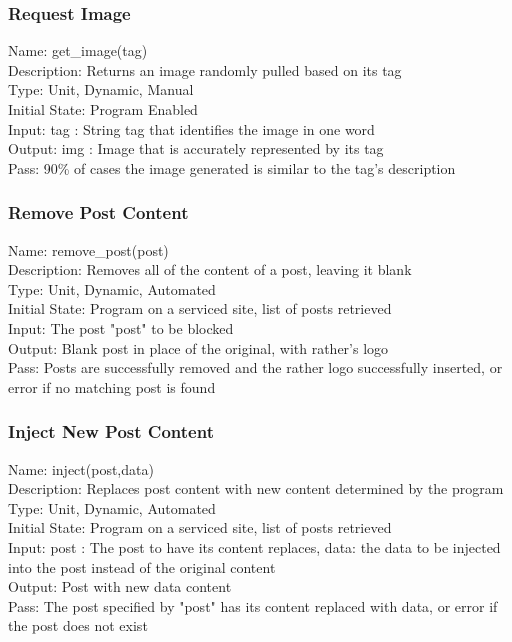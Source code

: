 \documentclass[12pt, titlepage]{article}
\begin{document}
\begin{enumerate}
\subsubsection{Request Image}
Name: get\_image(tag) \\
Description: Returns an image randomly pulled based on its tag \\
Type: Unit, Dynamic, Manual \\
Initial State: Program Enabled \\
Input: tag : String tag that identifies the image in one word \\
Output: img : Image that is accurately represented by its tag \\
Pass: 90\% of cases the image generated is similar to the tag's description \\
\subsubsection{Remove Post Content}
Name: remove\_post(post) \\
Description: Removes all of the content of a post, leaving it blank \\
Type: Unit, Dynamic, Automated \\
Initial State: Program on a serviced site, list of posts retrieved \\
Input: The post "post" to be blocked \\
Output: Blank post in place of the original, with rather's logo \\
Pass: Posts are successfully removed and the rather logo successfully inserted, or error if no matching post is found \\
\subsubsection{Inject New Post Content}
Name: inject(post,data) \\
Description: Replaces post content with new content determined by the program \\
Type: Unit, Dynamic, Automated \\
Initial State: Program on a serviced site, list of posts retrieved \\
Input: post : The post to have its content replaces, data: the data to be injected into the post instead of the original content \\
Output: Post with new data content \\
Pass: The post specified by "post" has its content replaced with data, or error if the post does not exist \\


\end{enumerate}
\end{document}
